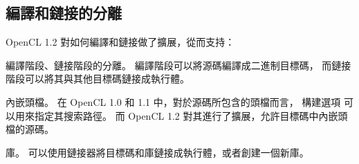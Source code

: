 \subsection{編譯和鏈接的分離}

OpenCL 1.2 對如何編譯和鏈接做了擴展，從而支持：
\startigBase
\item 編譯階段、鏈接階段的分離。
編譯階段可以將源碼編譯成二進制目標碼，
而鏈接階段可以將其與其他目標碼鏈接成執行體。

\item 內嵌頭檔。
在 OpenCL 1.0 和 1.1 中，對於源碼所包含的頭檔而言，
構建選項  可以用來指定其搜索路徑。
而 OpenCL 1.2 對其進行了擴展，允許目標碼中內嵌頭檔的源碼。

\item 庫。
可以使用鏈接器將目標碼和庫鏈接成執行體，或者創建一個新庫。
\stopigBase



